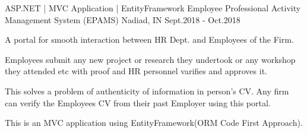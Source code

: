 \begin{cventries}

\cventry
{ASP.NET | MVC Application | EntityFramework} %
{Employee Professional Activity Management System (EPAMS)} %
{Nadiad, IN} %
{Sept.2018 - Oct.2018} %
{ %
\begin{cvitems}
\item {A portal for smooth interaction between HR Dept. and Employees of the Firm.}
\item {Employees submit any new project or research they undertook or any workshop they attended etc with proof and HR personnel varifies and approves it.}
\item {This solves a problem of authenticity of information in person's CV. Any firm can verify the Employees CV from their past Employer using this portal.}
\item {This is an MVC application using EntityFramework(ORM Code First Approach).}
\end{cvitems}
}


\end{cventries}